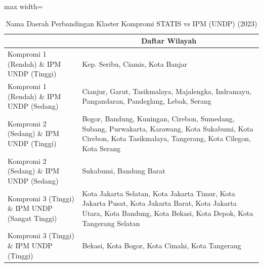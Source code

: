 \begin{table}[H]
\centering
\caption{Nama Daerah Perbandingan Klaster Kompromi STATIS vs IPM (UNDP) (2023)} \label{tab:app1comp_ipm_name_2023}
\begin{adjustbox}{max width=\textwidth}
\begin{tabular}{|>{\centering\arraybackslash}p{4cm}|p{10cm}|}
\hline
\multicolumn{1}{|c|}{\textbf{Kategori}} & \multicolumn{1}{c|}{\textbf{Daftar Wilayah}} \\
\hline
Kompromi 1 (Rendah) \& IPM UNDP (Tinggi) & Kep. Seribu, Ciamis, Kota Banjar \\
\hline
Kompromi 1 (Rendah) \& IPM UNDP (Sedang) & Cianjur, Garut, Tasikmalaya, Majalengka, Indramayu, Pangandaran, Pandeglang, Lebak, Serang \\
\hline
Kompromi 2 (Sedang) \& IPM UNDP (Tinggi) & Bogor, Bandung, Kuningan, Cirebon, Sumedang, Subang, Purwakarta, Karawang, Kota Sukabumi, Kota Cirebon, Kota Tasikmalaya, Tangerang, Kota Cilegon, Kota Serang \\
\hline
Kompromi 2 (Sedang) \& IPM UNDP (Sedang) & Sukabumi, Bandung Barat \\
\hline
Kompromi 3 (Tinggi) \& IPM UNDP (Sangat Tinggi) & Kota Jakarta Selatan, Kota Jakarta Timur, Kota Jakarta Pusat, Kota Jakarta Barat, Kota Jakarta Utara, Kota Bandung, Kota Bekasi, Kota Depok, Kota Tangerang Selatan \\
\hline
Kompromi 3 (Tinggi) \& IPM UNDP (Tinggi) & Bekasi, Kota Bogor, Kota Cimahi, Kota Tangerang \\
\hline
\end{tabular}
\end{adjustbox}
\end{table}